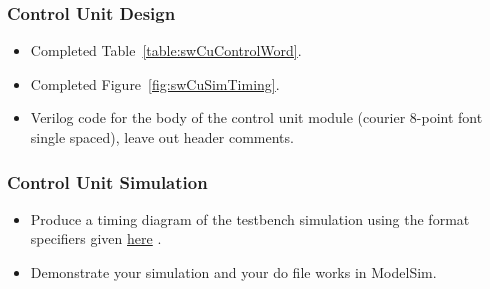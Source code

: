 \subsubsection{Control Unit Design}

\begin{itemize}
\item
  Completed Table~\ref{table:swCuControlWord}.
\item
  Completed Figure~\ref{fig:swCuSimTiming}.
\item
  Verilog code for the body of the control unit module (courier 8-point
  font single spaced), leave out header comments.
\end{itemize}

\subsubsection{Control Unit Simulation}

\begin{itemize}
\item
  Produce a timing diagram of the testbench simulation using the
  format specifiers given \hyperlink{swCuWaveform}{here} .
\end{itemize}

\begin{itemize}
\item
  Demonstrate your simulation and your do file works in ModelSim.
\end{itemize}

